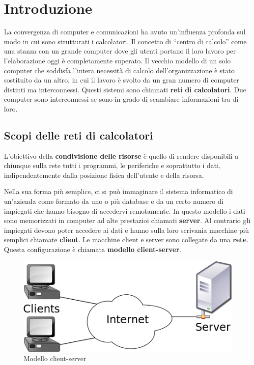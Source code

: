 \section{Introduzione}

La convergenza di computer e comunicazioni ha avuto un'influenza profonda sul modo in cui sono strutturati i calcolatori. Il concetto di ``centro di calcolo'' come una stanza con un grande computer dove gli utenti portano il loro lavoro per l'elaborazione oggi è completamente superato. Il vecchio modello di un solo computer che soddisfa l'intera necessità di calcolo dell'organizzazione è stato sostituito da un altro, in cui il lavoro è svolto da un gran numero di computer distinti ma interconnessi. Questi sistemi sono chiamati \textbf{reti di calcolatori}. Due computer sono interconnessi se sono in grado di scambiare informazioni tra di loro.

\subsection{Scopi delle reti di calcolatori}

L'obiettivo della \textbf{condivisione delle risorse} è quello di rendere disponibili a chiunque sulla rete tutti i programmi, le periferiche e soprattutto i dati, indipendentemente dalla posizione fisica dell'utente e della risorsa.

Nella sua forma più semplice, ci si può immaginare il sistema informatico di un'azienda come formato da uno o più database e da un certo numero di impiegati che hanno bisogno di accedervi remotamente. In questo modello i dati sono memorizzati in computer ad alte prestazioi chiamati \textbf{server}. Al contrario gli impiegati devono poter accedere ai dati e hanno sulla loro scrivania macchine più semplici chiamate \textbf{client}. Le macchine client e server sono collegate da una \textbf{rete}. Questa configurazione è chiamata \textbf{modello client-server}.

\begin{figure}[htpb]
\centering
\includegraphics[scale=1]{images/client-server-model.png}
\caption{Modello client-server}
\end{figure}

